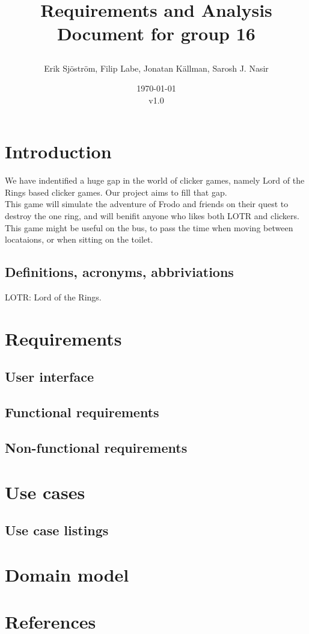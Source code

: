 \documentclass{article}
\title{
    Requirements and Analysis Document for group 16
    \author{Erik Sjöström,
            Filip Labe,
            Jonatan Källman,
            Sarosh J. Nasir}
    \date{\today \\v1.0}         
}
\begin{document}
\maketitle

\section{Introduction}
We have indentified a huge gap in the world of clicker games, namely 
Lord of the Rings based clicker games. Our project aims to fill that gap. \\
This game will simulate the adventure of Frodo and friends on their quest to
destroy the one ring, and will benifit anyone who likes both LOTR and clickers.\\
This game might be useful on the bus, to pass the time when moving between locataions, or when sitting on the toilet. 

\subsection{Definitions, acronyms, abbriviations}
LOTR: Lord of the Rings.

\section{Requirements}
\subsection{User interface}
\subsection{Functional requirements}
\subsection{Non-functional requirements}

\section{Use cases}
\subsection{Use case listings}

\section{Domain model}

\section{References}
\end{document}
